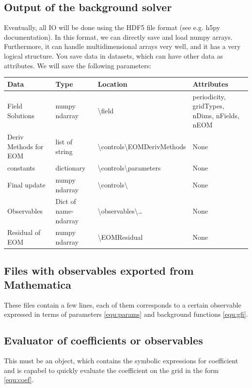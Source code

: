 \documentclass[a4paper,12pt]{article}
\begin{document}
\subsection{Output of the background solver}
Eventually, all IO will be done using the HDF5 file format (see e.g. h5py documentation). In this format, we can directly save and load numpy arrays. Furthermore, it can handle multidimensional arrays very well, and it has a very logical structure. You save data in datasets, which can have other data as attributes. We will save the following parameters: \\
\begin{tabular}{|p{3cm}|p{3.5cm}|p{5cm}|p{3.5cm}|}
\hline
Data & Type &  Location & Attributes \\
\hline \hline
Field Solutions & numpy ndarray& \textbackslash{}field & periodicity, gridTypes, nDims, nFields, nEOM \\
\hline
Deriv Methods for EOM & list of string & \textbackslash{}controls\textbackslash{}EOMDerivMethods & None\\ \hline
constants & dictionary & \textbackslash{}controls\textbackslash{}parameters & None \\ \hline
Final update & numpy ndarray & \textbackslash{}controls\textbackslash{} & None \\ \hline
Observables & Dict of name-ndarray & \textbackslash{}observables\textbackslash{}\ldots & None \\ \hline
Residual of EOM & numpy ndarray & \textbackslash{}EOMResidual & None \\ \hline

\end{tabular}
\subsection{\label{sec:observ_files} Files with observables exported from Mathematica}
These files contain a few lines, each of them corresponds to a certain observable expressed in terms of parameters \eqref{equ:params} and background functions \eqref{equ:gfi}.

\subsection{\label{sec:evaluator_coef} Evaluator of coefficients or observables}
This must be an object, which contains the symbolic expressions for coefficient and is capabel to quickly evaluate the coefficient on the grid in the form \eqref{equ:coef}.
\end{document}
